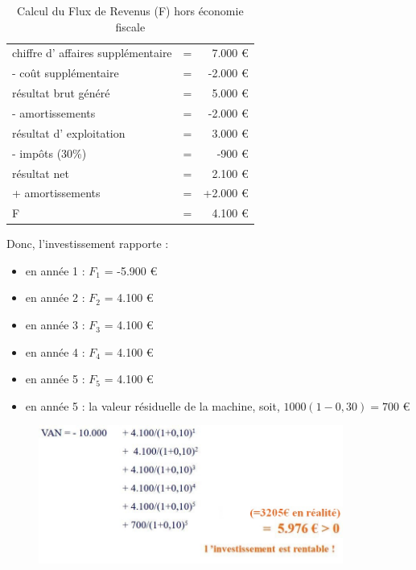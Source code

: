 \documentclass{article}
\begin{document}
\begin{table}[H]
\begin{tabular}{l c r}
	chiffre d’ affaires supplémentaire &=&	7.000 \euro{}\\
	- coût supplémentaire	&=&	-2.000 \euro{} \\
	\hline
	résultat brut généré	&=&	5.000 	\euro{}\\
	- amortissements	&=&	-2.000 	\euro{}\\
	\hline
	résultat d’	exploitation	&=&	3.000 \euro{}\\
	- impôts (30\%)	&=&	-900 	\euro{}\\
	\hline
	\color{red}résultat net	&\color{red}=&	\color{red}2.100 	\euro{}\\
	+ amortissements	&=&	+2.000 	\euro{}\\
	\hline
	\color{red}F	&\color{red}=&	\color{red}4.100 	\euro{}\\
\end{tabular}
\caption{\label{van} Calcul du Flux de Revenus (F) hors économie fiscale}
\end{table}

Donc, l’investissement rapporte :
\begin{itemize}
	\item en année 1 : $F_1$ = -5.900 \euro{}
	\item en année 2 : $F_2$	= 	4.100 \euro{}
	\item en année 3 : $F_3$	= 	4.100 \euro{}
	\item en année 4 :	$F_4$	= 	4.100 \euro{}
	\item en année 5 : $F_5$	= 	4.100 	\euro{}
	\item en année 5 : la valeur résiduelle de la machine, soit, $1000 (1-0,30) = 700$ \euro{}
\end{itemize}
\begin{figure}[H]
	\includegraphics[width=10cm]{van-rentabilite.jpg}
\end{figure}
\end{document}
